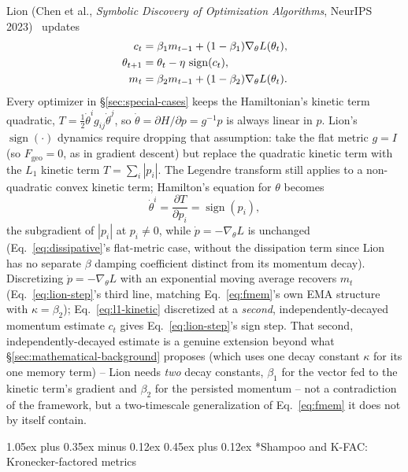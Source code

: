 \documentclass[10pt,twocolumn]{article}
\makeatletter
\renewcommand\subsection{\@startsection{subsection}{2}{0pt}%
  {1.05ex plus 0.35ex minus 0.12ex}%
  {0.45ex plus 0.12ex}%
  {\normalsize\bfseries}}
\makeatother
\begin{document}
Lion (Chen et al., \emph{Symbolic Discovery of Optimization Algorithms},
NeurIPS 2023)~\cite{chen2023lion} updates
\begin{align}
c_t &= \beta_1 m_{t-1} + (1-\beta_1)\nabla_\theta L(\theta_t), \notag\\
\theta_{t+1} &= \theta_t - \eta\,\operatorname{sign}(c_t),
\label{eq:lion-step}\\
m_t &= \beta_2 m_{t-1} + (1-\beta_2)\nabla_\theta L(\theta_t). \notag
\end{align}
Every optimizer in \S\ref{sec:special-cases} keeps the Hamiltonian's kinetic
term quadratic, $T=\tfrac12\dot\theta^i g_{ij}\dot\theta^j$, so
$\dot\theta=\partial H/\partial p=g^{-1}p$ is always linear in $p$. Lion's
$\operatorname{sign}(\cdot)$ dynamics require dropping that assumption:
take the flat metric $g=I$ (so $F_{\mathrm{geo}}=0$, as in gradient descent)
but replace the quadratic kinetic term with the $L_1$ kinetic term
$T=\sum_i|p_i|$. The Legendre transform still applies to a non-quadratic
convex kinetic term; Hamilton's equation for $\theta$ becomes
\begin{equation}
\dot\theta^i = \frac{\partial T}{\partial p_i} = \operatorname{sign}(p_i),
\label{eq:l1-kinetic}
\end{equation}
the subgradient of $|p_i|$ at $p_i\neq0$, while $\dot p=-\nabla_\theta L$
is unchanged (Eq.~\eqref{eq:dissipative}'s flat-metric case, without the
dissipation term since Lion has no separate $\beta$ damping coefficient
distinct from its momentum decay). Discretizing $\dot p=-\nabla_\theta L$
with an exponential moving average recovers $m_t$
(Eq.~\eqref{eq:lion-step}'s third line, matching Eq.~\eqref{eq:fmem}'s own
EMA structure with $\kappa=\beta_2$); Eq.~\eqref{eq:l1-kinetic} discretized
at a \emph{second}, independently-decayed momentum estimate $c_t$ gives
Eq.~\eqref{eq:lion-step}'s sign step. That second, independently-decayed
estimate is a genuine extension beyond what \S\ref{sec:mathematical-background}
proposes (which uses one decay constant $\kappa$ for its one memory term) --
Lion needs \emph{two} decay constants, $\beta_1$ for the vector fed to the
kinetic term's gradient and $\beta_2$ for the persisted momentum -- not a
contradiction of the framework, but a two-timescale generalization of
Eq.~\eqref{eq:fmem} it does not by itself contain.

\subsection*{Shampoo and K-FAC: Kronecker-factored metrics}
\end{document}
